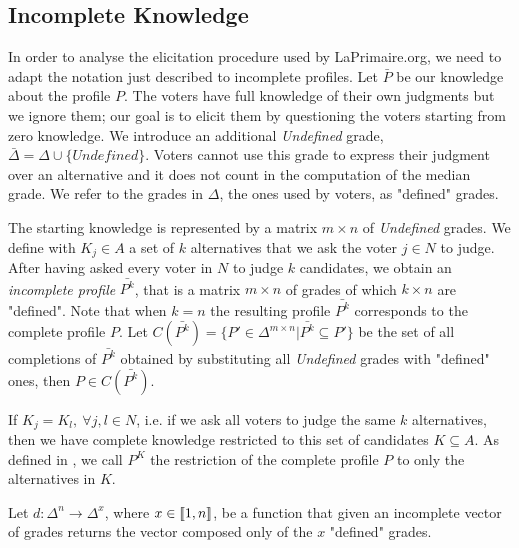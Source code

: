 \documentclass[version=3.21, pagesize, twoside=off, bibliography=totoc, DIV=calc, fontsize=12pt, a4paper]{scrartcl}
\begin{document}
\subsection{Incomplete Knowledge}
In order to analyse the elicitation procedure used by LaPrimaire.org, we need to adapt the notation just described to incomplete profiles. Let $\bar{P}$ be our knowledge about the profile $P$.
The voters have full knowledge of their own judgments but we ignore them; our goal is to elicit them by questioning the voters starting from zero knowledge.
We introduce an additional \emph{Undefined} grade, $\bar{\Delta}=\Delta \cup \{\textit{Undefined}\}$. Voters cannot use this grade to express their judgment over an alternative and it does not count in the computation of the median grade. We refer to the grades in $\Delta$, the ones used by voters, as "defined" grades.

The starting knowledge is represented by a matrix $m\times n$ of \textit{Undefined} grades. We define with $K_j \in A$ a set of $k$ alternatives that we ask the voter $j\in N$ to judge. After having asked every voter in $N$ to judge $k$ candidates, we obtain an \emph{incomplete profile} $\bar{P^k}$, that is a matrix $m \times n$ of grades of which $k \times n$ are "defined". Note that when $k=n$ the resulting profile $\bar{P^k}$ corresponds to the complete profile $P$. Let $C(\bar{P^k}) = \{P' \in \Delta^{m \times n} | \bar{P^k} \subseteq P'\}$ be the set of all completions of $\bar{P^k}$ obtained by substituting all \emph{Undefined} grades with "defined" ones, then $P \in C(\bar{P^k})$.

If $K_j=K_l, \ \forall j,l\in N$, i.e. if we ask all voters to judge the same $k$ alternatives, then we have complete knowledge restricted to this set of candidates $K \subseteq A$. As defined in , we call $P^{K}$ the restriction of the complete profile $P$ to only the alternatives in $K$.


Let $d:\Delta^{n}\rightarrow \Delta^{x}$, where $x \in \llbracket1,n\rrbracket$, be a function that given an incomplete vector of grades returns the vector composed only of the $x$ "defined" grades. 
\end{document}
